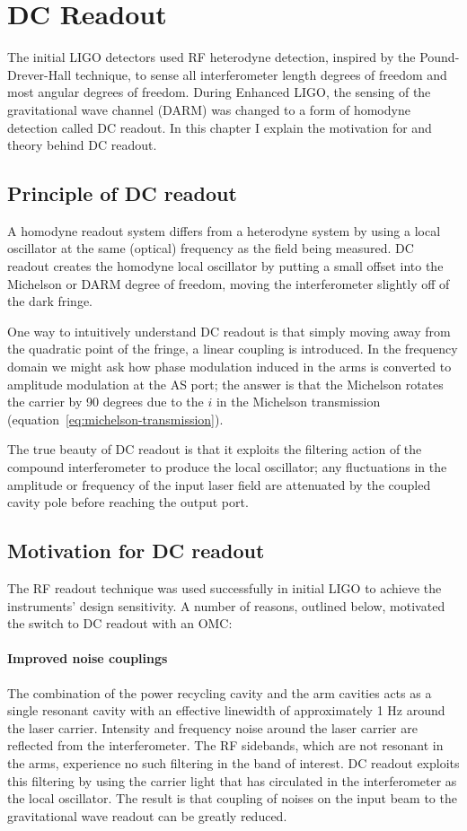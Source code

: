 \chapter{DC Readout}
\label{chapter3}

The initial LIGO detectors used RF heterodyne detection, inspired by
the Pound-Drever-Hall technique, to sense all interferometer length
degrees of freedom and most angular degrees of freedom.  During
Enhanced LIGO, the sensing of the gravitational wave channel (DARM)
was changed to a form of homodyne detection called DC readout.  In
this chapter I explain the motivation for and theory behind DC
readout.

\section{Principle of DC readout}
A homodyne readout system differs from a heterodyne system by using a
local oscillator at the same (optical) frequency as the field being measured.
%
DC readout creates the homodyne local oscillator by putting a small
offset into the Michelson or DARM degree of freedom, moving the
interferometer slightly off of the dark fringe.

One way to intuitively understand DC readout is that simply moving
away from the quadratic point of the fringe, a linear coupling is
introduced.  In the frequency domain we might ask how phase modulation
induced in the arms is converted to amplitude modulation at the AS
port; the answer is that the Michelson rotates the carrier by 90
degrees due to the $i$ in the Michelson transmission
(equation~\ref{eq:michelson-transmission}).

The true beauty of DC readout is that it exploits the filtering
action of the compound interferometer to produce the local oscillator;
any fluctuations in the amplitude or frequency of the input laser
field are attenuated by the coupled cavity pole before reaching the
output port.

\section{Motivation for DC readout}

The RF readout technique was used successfully in initial LIGO to
achieve the instruments' design sensitivity.  A number of reasons,
outlined below, motivated the switch to DC readout with an OMC:

\subsubsection*{Improved noise couplings} 
The combination of the power recycling cavity and the arm cavities
acts as a single resonant cavity with an effective linewidth of
approximately 1 Hz around the laser carrier.  Intensity and frequency
noise around the laser carrier are reflected from the
interferometer.  The RF sidebands, which are not resonant in the arms,
experience no such filtering in the band of interest.  DC readout
exploits this filtering by using the carrier light that has circulated
in the interferometer as the local oscillator.  The result is that
coupling of noises on the input beam to the gravitational wave readout
can be greatly reduced.

